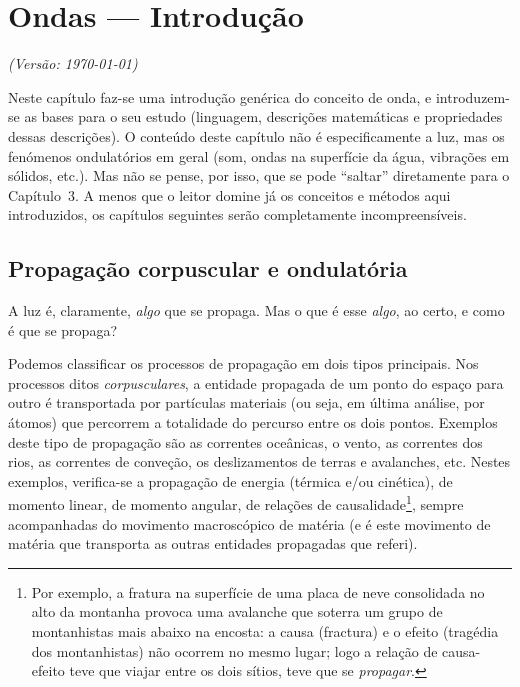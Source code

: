 \chapter{Ondas --- Introdução}
\textsl{{\sffamily(Versão: \today)}}

\noindent
Neste capítulo faz-se uma introdução genérica do conceito de onda, e
introduzem-se as bases para o seu estudo (linguagem, descrições matemáticas e
propriedades dessas descrições). O conteúdo deste capítulo não é especificamente
a luz, mas os fenómenos ondulatórios em geral (som, ondas na superfície da água,
vibrações em sólidos, etc.). Mas não se pense, por isso, que se pode ``saltar''
diretamente para o Capítulo~3. A menos que o leitor domine já os conceitos e
métodos aqui introduzidos, os capítulos seguintes serão completamente
incompreensíveis.

\section{Propagação corpuscular e ondulatória}
A luz é, claramente, \emph{algo} que se propaga. Mas o que é esse \emph{algo},
ao certo, e como é que se propaga?

Podemos classificar os processos de propagação em dois tipos principais. Nos
processos ditos \emph{corpusculares}, a entidade propagada de um ponto do espaço
para outro é transportada por partículas materiais (ou seja, em última análise,
por átomos) que percorrem a totalidade do percurso entre os dois pontos.
Exemplos deste tipo de propagação são as correntes oceânicas, o vento, as
correntes dos rios, as correntes de conveção, os deslizamentos de terras e
avalanches, etc. Nestes exemplos, verifica-se a propagação de energia (térmica
e/ou cinética), de momento linear, de momento angular, de relações de
causalidade\footnote{Por exemplo, a fratura na superfície de uma placa de neve
consolidada no alto da montanha provoca uma avalanche que soterra um grupo de
montanhistas mais abaixo na encosta: a causa (fractura) e o efeito (tragédia dos
montanhistas) não ocorrem no mesmo lugar; logo a relação de causa-efeito teve
que viajar entre os dois sítios, teve que se \emph{propagar}.}, sempre
acompanhadas do movimento macroscópico de matéria (e é este movimento de matéria
que transporta as outras entidades propagadas que referi).

